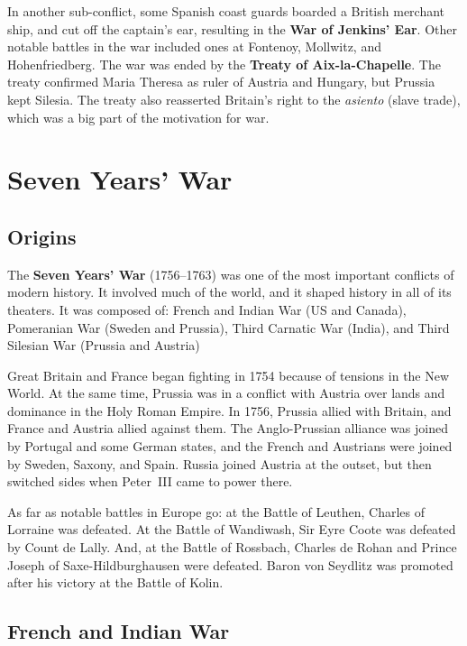 In another sub-conflict, some Spanish coast guards boarded a British merchant ship,
and cut off the captain's ear, resulting in the \textbf{War of Jenkins' Ear}.
Other notable battles in the war included ones at Fontenoy, Mollwitz, and Hohenfriedberg.
The war was ended by the \textbf{Treaty of Aix-la-Chapelle}.
The treaty confirmed Maria Theresa as ruler of Austria and Hungary, but Prussia kept Silesia.
The treaty also reasserted Britain's right to the \textit{asiento} (slave trade),
which was a big part of the motivation for war.

\section{Seven Years' War}

\subsection*{Origins}

The \textbf{Seven Years' War} (1756--1763) was one of the most important conflicts of modern history.
It involved much of the world, and it shaped history in all of its theaters.
It was composed of:
French and Indian War (US and Canada),
Pomeranian War (Sweden and Prussia),
Third Carnatic War (India),
and Third Silesian War (Prussia and Austria)

Great Britain and France began fighting in 1754 because of tensions in the New World.
At the same time, Prussia was in a conflict with Austria over lands and dominance in the Holy Roman Empire.
In 1756, Prussia allied with Britain, and France and Austria allied against them.
The Anglo-Prussian alliance was joined by Portugal and some German states,
and the French and Austrians were joined by Sweden, Saxony, and Spain.
Russia joined Austria at the outset, but then switched sides when Peter~III came to power there.

As far as notable battles in Europe go: at the Battle of Leuthen, Charles of Lorraine was defeated.
At the Battle of Wandiwash, Sir Eyre Coote was defeated by Count de Lally.
And, at the Battle of Rossbach, Charles de Rohan and Prince Joseph of Saxe-Hildburghausen were defeated.
Baron von Seydlitz was promoted after his victory at the Battle of Kolin.

\subsection*{French and Indian War}

